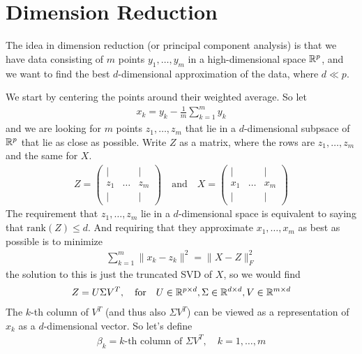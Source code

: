 \section{Dimension Reduction}
The idea in dimension reduction (or principal component analysis) is that we have data consisting of $m$ points $y_{1}, \ldots, y_{m}$ in a high-dimensional space $\mathbb{R}^{p}$, and we want to find the best $d$-dimensional approximation of the data, where $d \ll p$.


We start by centering the points around their weighted average. So let
\begin{align*}
  x_k = y_k - \frac{1}{m} \sum_{k=1}^{m}y_k
\end{align*}
and we are looking for $m$ points $z_{1}, \ldots, z_{m}$ that lie in a $d$-dimensional subpsace of $\mathbb{R}^{p}$ that lie as close as possible.
Write $Z$ as a matrix, where the rows are $z_{1}, \ldots, z_{m}$ and the same for $X$.
\begin{align*}
  Z = \begin{pmatrix}
  \vert &  &\vert \\
   z_1& \ldots &z_m \\
   \vert&  & \vert
  \end{pmatrix}
  \quad \text{and} \quad 
  X = \begin{pmatrix}
  \vert &  &\vert \\
   x_1& \ldots &x_m \\
   \vert&  & \vert
  \end{pmatrix}
\end{align*}
The requirement that $z_{1}, \ldots, z_{m}$ lie in a $d$-dimensional space is equivalent to saying that $\text{rank}(Z) \leq d$.
And requiring that they approximate $x_{1}, \ldots, x_{m}$ as best as possible is to minimize
\begin{align*}
  \sum_{k=1}^{m}\|x_k - z_k\|^{2} = \|X - Z\|_F^{2}
\end{align*}
the solution to this is just the truncated SVD of $X$, so we would find
\begin{align*}
  Z = U \Sigma V^{T}, \quad \text{for} \quad U \in \mathbb{R}^{p \times d}, \Sigma \in \mathbb{R}^{d \times d}, V \in \mathbb{R}^{m \times d}
\end{align*}
The $k$-th column of $V^{T}$ (and thus also $\Sigma V^{T}$) can be viewed as a representation of $x_k$ as a $d$-dimensional vector.
So let's define
\begin{align*}
  \beta_k = k\text{-th column of } \Sigma V^{T}, \quad k = 1, \ldots, m
\end{align*}
